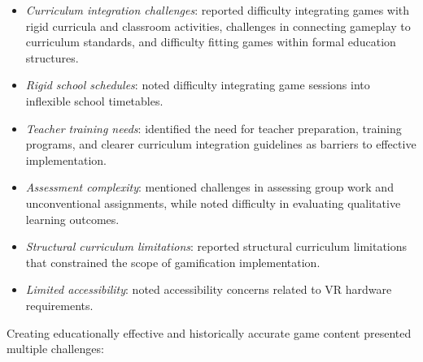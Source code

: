 \documentclass[a4paper,fleqn]{cas-sc}
\begin{document}
\begin{itemize}[noitemsep]
 \item \textit{Curriculum integration challenges}: \citet{3Watson2011466, 4Cruz2017, 20Erandaru2014, 60Hoy2018, 65Razak201139} reported difficulty integrating games with rigid curricula and classroom activities, challenges in connecting gameplay to curriculum standards, and difficulty fitting games within formal education structures.
 
 \item \textit{Rigid school schedules}: \citet{3Watson2011466} noted difficulty integrating game sessions into inflexible school timetables.
 
 \item \textit{Teacher training needs}: \citet{4Cruz2017, 46Stirling2022, 60Hoy2018, 79Fernes2024379} identified the need for teacher preparation, training programs, and clearer curriculum integration guidelines as barriers to effective implementation.
 
 \item \textit{Assessment complexity}: \citet{60Hoy2018} mentioned challenges in assessing group work and unconventional assignments, while \citet{42Huffer201581} noted difficulty in evaluating qualitative learning outcomes.
 
 \item \textit{Structural curriculum limitations}: \citet{34Serrano2023} reported structural curriculum limitations that constrained the scope of gamification implementation.
 
 \item \textit{Limited accessibility}: \citet{5kazanidis2018alpha} noted accessibility concerns related to VR hardware requirements.
\end{itemize}


Creating educationally effective and historically accurate game content presented multiple challenges:
\end{document}
